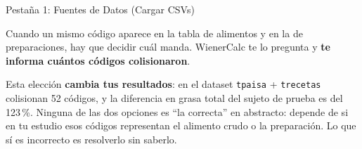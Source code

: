 \documentclass[11pt,a4paper]{article}
\begin{document}
\begin{stepcard}{Pestaña 1: Fuentes de Datos (Cargar CSVs)}
\begin{warningbox}
Cuando un mismo código aparece en la tabla de alimentos y en la de preparaciones, hay que decidir cuál manda. WienerCalc te lo pregunta y \textbf{te informa cuántos códigos colisionaron}.

Esta elección \textbf{cambia tus resultados}: en el dataset \texttt{tpaisa} + \texttt{trecetas} colisionan 52 códigos, y la diferencia en grasa total del sujeto de prueba es del 123\,\%. Ninguna de las dos opciones es ``la correcta'' en abstracto: depende de si en tu estudio esos códigos representan el alimento crudo o la preparación. Lo que sí es incorrecto es resolverlo sin saberlo.
\end{warningbox}
\end{stepcard}

\vspace{0.4cm}
\end{document}
